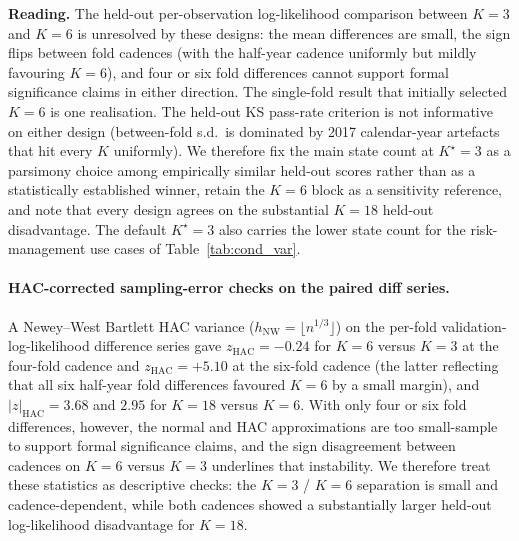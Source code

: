 \textbf{Reading.} The held-out per-observation log-likelihood comparison between $K = 3$ and $K = 6$ is unresolved by these designs: the mean differences are small, the sign flips between fold cadences (with the half-year cadence uniformly but mildly favouring $K = 6$), and four or six fold differences cannot support formal significance claims in either direction. The single-fold result that initially selected $K = 6$ is one realisation. The held-out KS pass-rate criterion is not informative on either design (between-fold s.d.\ is dominated by 2017 calendar-year artefacts that hit every $K$ uniformly). We therefore fix the main state count at $K^\star = 3$ as a parsimony choice among empirically similar held-out scores rather than as a statistically established winner, retain the $K = 6$ block as a sensitivity reference, and note that every design agrees on the substantial $K = 18$ held-out disadvantage. The default $K^\star = 3$ also carries the lower state count for the risk-management use cases of Table~\ref{tab:cond_var}.

\paragraph{HAC-corrected sampling-error checks on the paired diff series.}
\label{sec:k_selection_hac}
A Newey--West Bartlett HAC variance ($h_{\text{NW}} = \lfloor n^{1/3} \rfloor$) on the per-fold validation-log-likelihood difference series gave $z_{\text{HAC}} = -0.24$ for $K = 6$ versus $K = 3$ at the four-fold cadence and $z_{\text{HAC}} = +5.10$ at the six-fold cadence (the latter reflecting that all six half-year fold differences favoured $K = 6$ by a small margin), and $|z|_{\text{HAC}} = 3.68$ and $2.95$ for $K = 18$ versus $K = 6$. With only four or six fold differences, however, the normal and HAC approximations are too small-sample to support formal significance claims, and the sign disagreement between cadences on $K = 6$ versus $K = 3$ underlines that instability. We therefore treat these statistics as descriptive checks: the $K = 3$ / $K = 6$ separation is small and cadence-dependent, while both cadences showed a substantially larger held-out log-likelihood disadvantage for $K = 18$.

